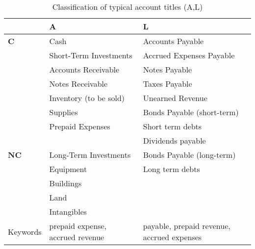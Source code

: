 \begin{table}[H]
    \centering
    \begin{tabular}{|p{}|p{}|p{}|}
        \hline
                    & \textbf{A}                       & \textbf{L}                                 \\
        \hline
        \textbf{C}  & Cash                             & Accounts Payable                           \\
                    & Short-Term Investments           & Accrued Expenses Payable                   \\
                    & Accounts Receivable              & Notes Payable                              \\
                    & Notes Receivable                 & Taxes Payable                              \\
                    & Inventory (to be sold)           & Unearned Revenue                           \\
                    & Supplies                         & Bonds Payable (short-term)                 \\
                    & Prepaid Expenses                 & Short term debts                           \\
                    &                                  & Dividends payable                          \\
        \hline
        \textbf{NC} & Long-Term Investments            & Bonds Payable (long-term)                  \\
                    & Equipment                        & Long term debts                            \\
                    & Buildings                        &                                            \\
                    & Land                             &                                            \\
                    & Intangibles                      &                                            \\
        \hline
        Keywords    & prepaid expense, accrued revenue & payable, prepaid revenue, accrued expenses \\
        \hline
    \end{tabular}
    \caption{Classification of typical account titles (A,L)}
\end{table}

